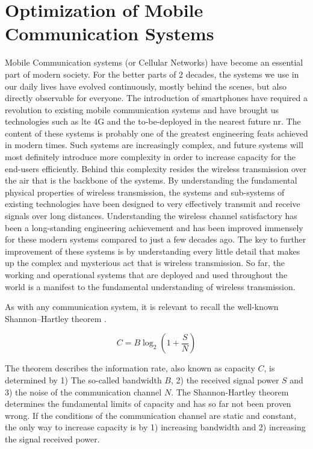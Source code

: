 \chapter{Optimization of Mobile Communication Systems}\label{ch:monster}

Mobile Communication systems (or Cellular Networks) have become an essential part of modern society. For the better parts of 2 decades, the systems we use in our daily lives have evolved continuously, mostly behind the scenes, but also directly observable for everyone. The introduction of smartphones have required a revolution to existing mobile communication systems and have brought us technologies such as \gls{lte} $4$G and the to-be-deployed in the nearest future \acrfull{nr}. The content of these systems is probably one of the greatest engineering feats achieved in modern times. Such systems are increasingly complex, and future systems will most definitely introduce more complexity in order to increase capacity for the end-users efficiently. Behind this complexity resides the wireless transmission over the air that is the backbone of the systems. By understanding the fundamental physical properties of wireless transmission, the systems and sub-systems of existing technologies have been designed to very effectively transmit and receive signals over long distances. Understanding the wireless channel satisfactory has been a long-standing engineering achievement and has been improved immensely for these modern systems compared to just a few decades ago. The key to further improvement of these systems is by understanding every little detail that makes up the complex and mysterious act that is wireless transmission. So far, the working and operational systems that are deployed and used throughout the world is a manifest to the fundamental understanding of wireless transmission. 

As with any communication system, it is relevant to recall the well-known Shannon–Hartley theorem \cite{Tse2005FundamentalsCommunication}.

\begin{equation}\label{eq:shannon}
    C = B \log_2 \left( 1 + \frac{S}{N} \right)
\end{equation}

The theorem describes the information rate, also known as capacity $C$, is determined by 1) The so-called bandwidth $B$, 2) the received signal power $S$ and 3) the noise of the communication channel $N$. The Shannon-Hartley theorem determines the fundamental limits of capacity and has so far not been proven wrong. If the conditions of the communication channel are static and constant, the only way to increase capacity is by 1) increasing bandwidth and 2) increasing the signal received power.

